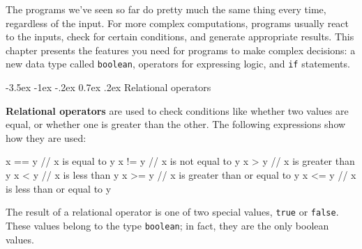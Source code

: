 \documentclass[12pt]{book}
\makeatletter
\theoremstyle{exercise}
\newcommand{\java}[1]{\verb"#1"}
\renewcommand{\section}{\@startsection{section}{1}{\z@}%
    {-3.5ex \@plus -1ex \@minus -.2ex}%
    {0.7ex \@plus.2ex}%
    {\normalfont\Large\bfseries}}
\newcommand{\java}[1]{\lstinline{#1}} %
\makeatother
\begin{document}

The programs we've seen so far do pretty much the same thing every time, regardless of the input.
For more complex computations, programs usually react to the inputs, check for certain conditions, and generate appropriate results.
This chapter presents the features you need for programs to make complex decisions: a new data type called \java{boolean}, operators for expressing logic, and \java{if} statements.




\section{Relational operators}


{\bf Relational operators} are used to check conditions like whether two values are equal, or whether one is greater than the other.
The following expressions show how they are used:

\begin{code}
    x == y          // x is equal to y
    x != y          // x is not equal to y
    x > y           // x is greater than y
    x < y           // x is less than y
    x >= y          // x is greater than or equal to y
    x <= y          // x is less than or equal to y
\end{code}

The result of a relational operator is one of two special values, \java{true} or \java{false}.
These values belong to the type \java{boolean}; in fact, they are the only boolean values.
\end{document}
